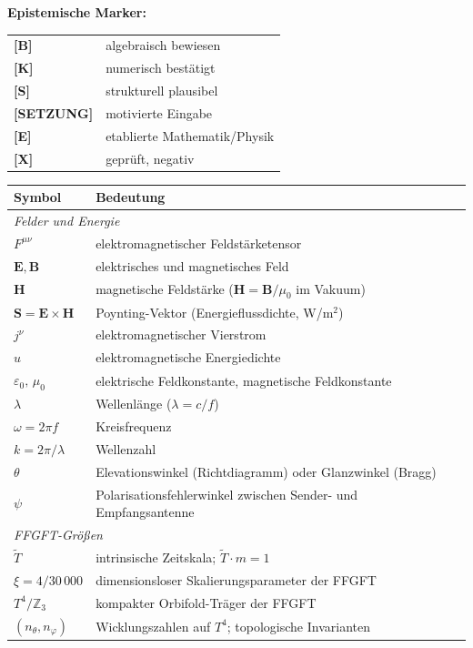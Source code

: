 \medskip
\textbf{Epistemische Marker:}
\begin{tabular}{@{}lp{4.5cm}@{}}
\textbf{[B]} & algebraisch bewiesen \\
\textbf{[K]} & numerisch bestätigt \\
\textbf{[S]} & strukturell plausibel \\
\textbf{[SETZUNG]} & motivierte Eingabe \\
\textbf{[E]} & etablierte Mathematik/Physik \\
\textbf{[X]} & geprüft, negativ \\
\end{tabular}

\medskip
\begin{longtable}{@{}lp{7cm}@{}}
\toprule
\textbf{Symbol} & \textbf{Bedeutung} \\
\midrule
\multicolumn{2}{l}{\textit{Felder und Energie}} \\
$F^{\mu\nu}$ & elektromagnetischer Feldstärketensor \\
$\mathbf{E}, \mathbf{B}$ & elektrisches und magnetisches Feld \\
$\mathbf{H}$ & magnetische Feldstärke ($\mathbf{H} = \mathbf{B}/\mu_0$ im Vakuum) \\
$\mathbf{S} = \mathbf{E}\times\mathbf{H}$ & Poynting-Vektor (Energieflussdichte, W/m$^2$) \\
$j^\nu$ & elektromagnetischer Vierstrom \\
$u$ & elektromagnetische Energiedichte \\
$\varepsilon_0,\,\mu_0$ & elektrische Feldkonstante, magnetische Feldkonstante \\
$\lambda$ & Wellenlänge ($\lambda = c/f$) \\
$\omega = 2\pi f$ & Kreisfrequenz \\
$k = 2\pi/\lambda$ & Wellenzahl \\
$\theta$ & Elevationswinkel (Richtdiagramm) oder Glanzwinkel (Bragg) \\
$\psi$ & Polarisationsfehlerwinkel zwischen Sender- und Empfangsantenne \\
\midrule
\multicolumn{2}{l}{\textit{FFGFT-Größen}} \\
$\tilde{T}$ & intrinsische Zeitskala; $\tilde{T} \cdot m = 1$ \\
$\xi = 4/30\,000$ & dimensionsloser Skalierungsparameter der FFGFT \\
$T^4/\mathbb{Z}_3$ & kompakter Orbifold-Träger der FFGFT \\
$(n_\theta, n_\varphi)$ & Wicklungszahlen auf $T^4$; topologische Invarianten \\

\end{longtable}
